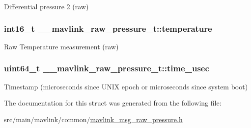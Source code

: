 Differential pressure 2 (raw) 

\hypertarget{struct____mavlink__raw__pressure__t_a7d57fd80130f0588285f03669bf8c016}{
\subsubsection[{temperature}]{\setlength{\rightskip}{0pt plus 5cm}int16\+\_\+t \+\_\+\+\_\+mavlink\+\_\+raw\+\_\+pressure\+\_\+t\+::temperature}}\label{struct____mavlink__raw__pressure__t_a7d57fd80130f0588285f03669bf8c016}


Raw Temperature measurement (raw) 

\hypertarget{struct____mavlink__raw__pressure__t_a659746eb22bad8e9e29aac0efcba19d2}{
\subsubsection[{time\+\_\+usec}]{\setlength{\rightskip}{0pt plus 5cm}uint64\+\_\+t \+\_\+\+\_\+mavlink\+\_\+raw\+\_\+pressure\+\_\+t\+::time\+\_\+usec}}\label{struct____mavlink__raw__pressure__t_a659746eb22bad8e9e29aac0efcba19d2}


Timestamp (microseconds since U\+N\+I\+X epoch or microseconds since system boot) 



The documentation for this struct was generated from the following file\+:\begin{DoxyCompactItemize}
\item 
src/main/mavlink/common/\hyperlink{mavlink__msg__raw__pressure_8h}{mavlink\+\_\+msg\+\_\+raw\+\_\+pressure.\+h}\end{DoxyCompactItemize}
